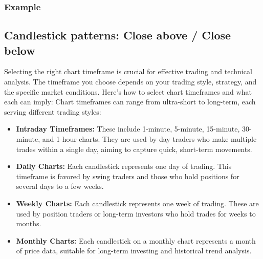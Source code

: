 \documentclass{report}
\begin{document}
    \bigbreak \noindent 
    \subsubsection{Example}
    \bigbreak \noindent 



     \bigbreak \noindent 
     \subsection{Candlestick patterns: Close above / Close below}
     
     \pagebreak 
     \bigbreak \noindent 
     Selecting the right chart timeframe is crucial for effective trading and technical analysis. The timeframe you choose depends on your trading style, strategy, and the specific market conditions. Here’s how to select chart timeframes and what each can imply:
     \bigbreak \noindent 
     Chart timeframes can range from ultra-short to long-term, each serving different trading styles:
     \begin{itemize}
         \item \textbf{Intraday Timeframes:} These include 1-minute, 5-minute, 15-minute, 30-minute, and 1-hour charts. They are used by day traders who make multiple trades within a single day, aiming to capture quick, short-term movements.
         \item \textbf{Daily Charts:} Each candlestick represents one day of trading. This timeframe is favored by swing traders and those who hold positions for several days to a few weeks.
         \item \textbf{Weekly Charts:} Each candlestick represents one week of trading. These are used by position traders or long-term investors who hold trades for weeks to months.
         \item \textbf{Monthly Charts:} Each candlestick on a monthly chart represents a month of price data, suitable for long-term investing and historical trend analysis.
     \end{itemize}

     \bigbreak \noindent 
\end{document}

